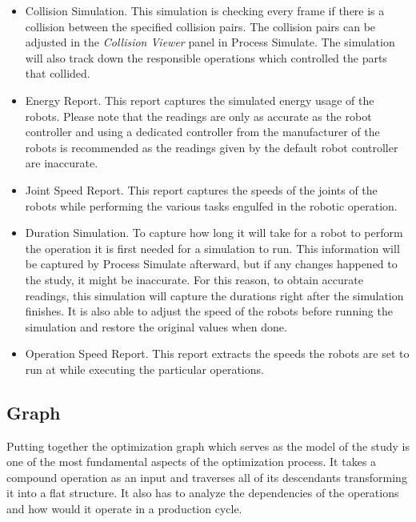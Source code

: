 \begin{itemize}

\item Collision Simulation. This simulation is checking every frame if there is a collision between the specified collision pairs. The collision pairs can be adjusted in the \emph{Collision Viewer} panel in Process Simulate. The simulation will also track down the responsible operations which controlled the parts that collided.

\item Energy Report. This report captures the simulated energy usage of the robots. Please note that the readings are only as accurate as the robot controller and using a dedicated controller from the manufacturer of the robots is recommended as the readings given by the default robot controller are inaccurate.

\item Joint Speed Report. This report captures the speeds of the joints of the robots while performing the various tasks engulfed in the robotic operation.

\item Duration Simulation. To capture how long it will take for a robot to perform the operation it is first needed for a simulation to run. This information will be captured by Process Simulate afterward, but if any changes happened to the study, it might be inaccurate. For this reason, to obtain accurate readings, this simulation will capture the durations right after the simulation finishes. It is also able to adjust the speed of the robots before running the simulation and restore the original values when done. 

\item Operation Speed Report. This report extracts the speeds the robots are set to run at while executing the particular operations. 

\end{itemize}

\subsection{Graph}


Putting together the optimization graph which serves as the model of the study is one of the most fundamental aspects of the optimization process. It takes a compound operation as an input and traverses all of its descendants transforming it into a flat structure. It also has to analyze the dependencies of the operations and how would it operate in a production cycle. \\

